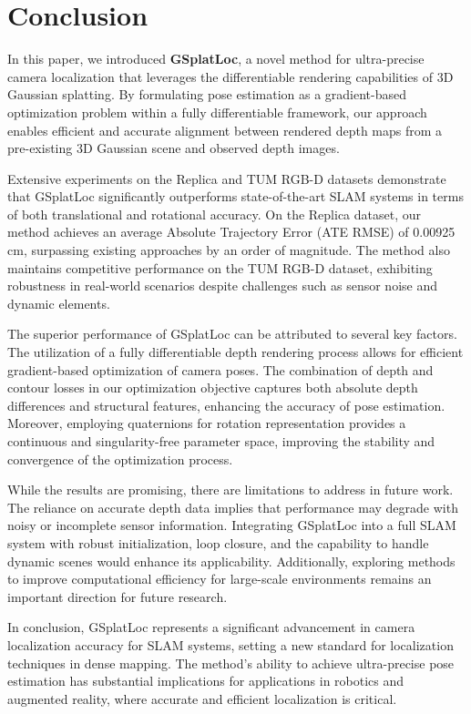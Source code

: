 \documentclass[twocolumn]{article} %
\begin{document}
\section{Conclusion}\label{conclusion}

In this paper, we introduced \textbf{GSplatLoc}, a novel method for
ultra-precise camera localization that leverages the differentiable
rendering capabilities of 3D Gaussian splatting. By formulating pose
estimation as a gradient-based optimization problem within a fully
differentiable framework, our approach enables efficient and accurate
alignment between rendered depth maps from a pre-existing 3D Gaussian
scene and observed depth images.

Extensive experiments on the Replica and TUM RGB-D datasets demonstrate
that GSplatLoc significantly outperforms state-of-the-art SLAM systems
in terms of both translational and rotational accuracy. On the Replica
dataset, our method achieves an average Absolute Trajectory Error (ATE
RMSE) of 0.00925\,cm, surpassing existing approaches by an order of
magnitude. The method also maintains competitive performance on the TUM
RGB-D dataset, exhibiting robustness in real-world scenarios despite
challenges such as sensor noise and dynamic elements.

The superior performance of GSplatLoc can be attributed to several key
factors. The utilization of a fully differentiable depth rendering
process allows for efficient gradient-based optimization of camera
poses. The combination of depth and contour losses in our optimization
objective captures both absolute depth differences and structural
features, enhancing the accuracy of pose estimation. Moreover, employing
quaternions for rotation representation provides a continuous and
singularity-free parameter space, improving the stability and
convergence of the optimization process.

While the results are promising, there are limitations to address in
future work. The reliance on accurate depth data implies that
performance may degrade with noisy or incomplete sensor information.
Integrating GSplatLoc into a full SLAM system with robust
initialization, loop closure, and the capability to handle dynamic
scenes would enhance its applicability. Additionally, exploring methods
to improve computational efficiency for large-scale environments remains
an important direction for future research.

In conclusion, GSplatLoc represents a significant advancement in camera
localization accuracy for SLAM systems, setting a new standard for
localization techniques in dense mapping. The method's ability to
achieve ultra-precise pose estimation has substantial implications for
applications in robotics and augmented reality, where accurate and
efficient localization is critical.

\printbibliography
\end{document}

